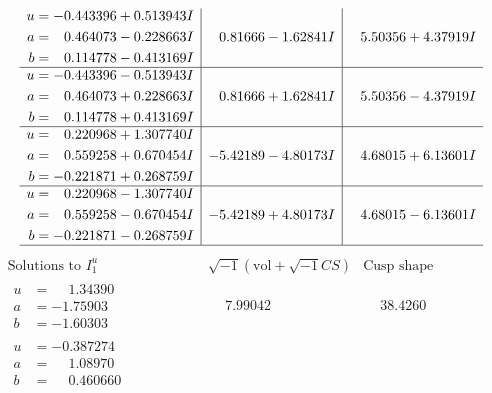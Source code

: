 \documentclass[1p]{elsarticle_modified}
\theoremstyle{definition}
\newcommand{\I}{\sqrt{-1}}
\begin{document}
$$\begin{array}{c|c|c}
\begin{aligned}
u &= -0.443396 + 0.513943 I \\
a &= \phantom{-}0.464073 - 0.228663 I \\
b &= \phantom{-}0.114778 - 0.413169 I\end{aligned}
 & \phantom{-}0.81666 - 1.62841 I & \phantom{-}5.50356 + 4.37919 I \\ \hline\begin{aligned}
u &= -0.443396 - 0.513943 I \\
a &= \phantom{-}0.464073 + 0.228663 I \\
b &= \phantom{-}0.114778 + 0.413169 I\end{aligned}
 & \phantom{-}0.81666 + 1.62841 I & \phantom{-}5.50356 - 4.37919 I \\ \hline\begin{aligned}
u &= \phantom{-}0.220968 + 1.307740 I \\
a &= \phantom{-}0.559258 + 0.670454 I \\
b &= -0.221871 + 0.268759 I\end{aligned}
 & -5.42189 - 4.80173 I & \phantom{-}4.68015 + 6.13601 I \\ \hline\begin{aligned}
u &= \phantom{-}0.220968 - 1.307740 I \\
a &= \phantom{-}0.559258 - 0.670454 I \\
b &= -0.221871 - 0.268759 I\end{aligned}
 & -5.42189 + 4.80173 I & \phantom{-}4.68015 - 6.13601 I\\
 \hline 
 \end{array}$$\newpage$$\begin{array}{c|c|c}  
\text{Solutions to }I^u_{1}& \I (\text{vol} + \sqrt{-1}CS) & \text{Cusp shape}\\
 \hline 
\begin{aligned}
u &= \phantom{-}1.34390\phantom{ +0.000000I} \\
a &= -1.75903\phantom{ +0.000000I} \\
b &= -1.60303\phantom{ +0.000000I}\end{aligned}
 & \phantom{-}7.99042\phantom{ +0.000000I} & \phantom{-}38.4260\phantom{ +0.000000I} \\ \hline\begin{aligned}
u &= -0.387274\phantom{ +0.000000I} \\
a &= \phantom{-}1.08970\phantom{ +0.000000I} \\
b &= \phantom{-}0.460660\phantom{ +0.000000I}\end{aligned}

\end{array}$$
\end{document}
